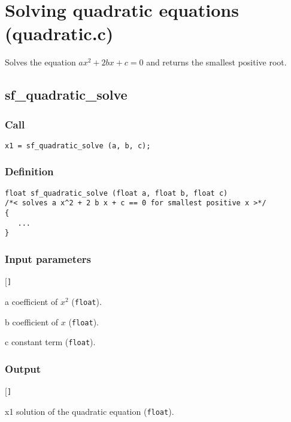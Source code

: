 \section{Solving quadratic equations (quadratic.c)}
Solves the equation $ax^2 + 2bx + c = 0$ and returns the smallest positive root.



\subsection{{sf\_quadratic\_solve}}

\subsubsection*{Call}
\begin{verbatim}x1 = sf_quadratic_solve (a, b, c);\end{verbatim}

\subsubsection*{Definition}
\begin{verbatim}
float sf_quadratic_solve (float a, float b, float c) 
/*< solves a x^2 + 2 b x + c == 0 for smallest positive x >*/
{
   ...
}
\end{verbatim}

\subsubsection*{Input parameters}
\begin{desclist}{\tt }{\quad}[\tt ]
   \setlength\itemsep{0pt}
   \item[a] coefficient of $x^2$ (\texttt{float}). 
   \item[b] coefficient of $x$ (\texttt{float}). 
   \item[c] constant term (\texttt{float}).  
\end{desclist}

\subsubsection*{Output}
\begin{desclist}{\tt }{\quad}[\tt ]
   \setlength\itemsep{0pt}
   \item[x1] solution of the quadratic equation (\texttt{float}).
\end{desclist}




